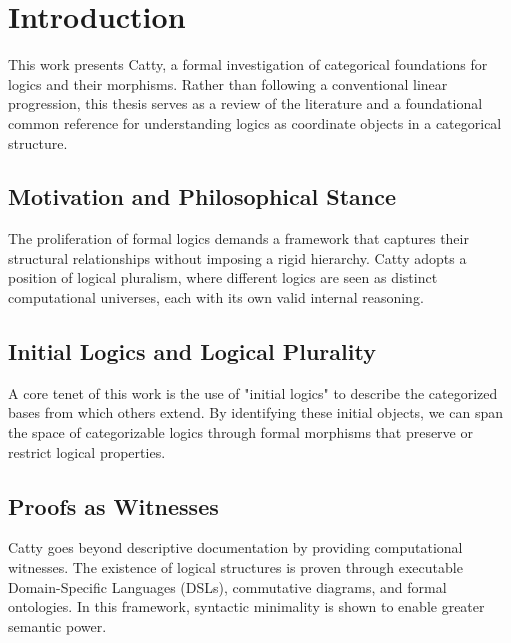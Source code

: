 
\chapter*{Introduction}
{}

This work presents Catty, a formal investigation of categorical foundations for logics and their morphisms. Rather than following a conventional linear progression, this thesis serves as a review of the literature and a foundational common reference for understanding logics as coordinate objects in a categorical structure.

\section*{Motivation and Philosophical Stance}
The proliferation of formal logics demands a framework that captures their structural relationships without imposing a rigid hierarchy. Catty adopts a position of logical pluralism, where different logics are seen as distinct computational universes, each with its own valid internal reasoning.

\section*{Initial Logics and Logical Plurality}
A core tenet of this work is the use of "initial logics" to describe the categorized bases from which others extend. By identifying these initial objects, we can span the space of categorizable logics through formal morphisms that preserve or restrict logical properties.

\section*{Proofs as Witnesses}
Catty goes beyond descriptive documentation by providing computational witnesses. The existence of logical structures is proven through executable Domain-Specific Languages (DSLs), commutative diagrams, and formal ontologies. In this framework, syntactic minimality is shown to enable greater semantic power.

